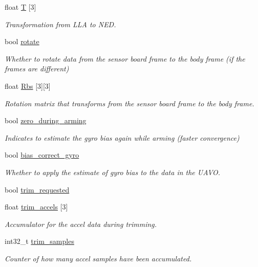 \begin{DoxyCompactItemize}
float \hyperlink{group___state_estimation_filters_ga45b3fda0427f0fab27b88df83ae9108d}{\-T} \mbox{[}3\mbox{]}
\begin{DoxyCompactList}\small\item\em \-Transformation from \-L\-L\-A to \-N\-E\-D. \end{DoxyCompactList}\item 
bool \hyperlink{group___state_estimation_filters_gad5da7bf77c18e9d5990d4b6d6f28477e}{rotate}
\begin{DoxyCompactList}\small\item\em \-Whether to rotate data from the sensor board frame to the body frame (if the frames are different) \end{DoxyCompactList}\item 
float \hyperlink{group___state_estimation_filters_ga6c34048525801ac0e7e26eb733c759d5}{\-Rbs} \mbox{[}3\mbox{]}\mbox{[}3\mbox{]}
\begin{DoxyCompactList}\small\item\em \-Rotation matrix that transforms from the sensor board frame to the body frame. \end{DoxyCompactList}\item 
bool \hyperlink{group___state_estimation_filters_gaa625401f5bc69c19b54b3171703f37f9}{zero\-\_\-during\-\_\-arming}
\begin{DoxyCompactList}\small\item\em \-Indicates to estimate the gyro bias again while arming (faster convergence) \end{DoxyCompactList}\item 
bool \hyperlink{group___state_estimation_filters_ga3df4e05bd900b439ad746cbadce667d5}{bias\-\_\-correct\-\_\-gyro}
\begin{DoxyCompactList}\small\item\em \-Whether to apply the estimate of gyro bias to the data in the \-U\-A\-V\-O. \end{DoxyCompactList}\item 
bool \hyperlink{group___state_estimation_filters_ga1b90881e0b0eb5aa9cf39d0ba8ef5e0d}{trim\-\_\-requested}
\item 
float \hyperlink{group___state_estimation_filters_ga8941c16a263cb020587ef58dd38f8281}{trim\-\_\-accels} \mbox{[}3\mbox{]}
\begin{DoxyCompactList}\small\item\em \-Accumulator for the accel data during trimming. \end{DoxyCompactList}\item 
int32\-\_\-t \hyperlink{group___state_estimation_filters_ga9e5b2790cd84db83278b3c8c289ea411}{trim\-\_\-samples}
\begin{DoxyCompactList}\small\item\em \-Counter of how many accel samples have been accumulated. \end{DoxyCompactList}\end{DoxyCompactItemize}


